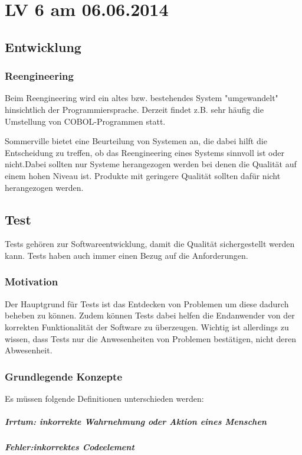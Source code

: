 \chapter{LV 6 am 06.06.2014}
\section{Entwicklung}
\subsection{Reengineering}
Beim Reengineering wird ein altes bzw. bestehendes System "umgewandelt" hinsichtlich der Programmiersprache. Derzeit findet z.B. sehr häufig die Umstellung von COBOL-Programmen statt.

Sommerville bietet eine Beurteilung von Systemen an, die dabei hilft die Entscheidung zu treffen, ob das Reengineering eines Systems sinnvoll ist oder nicht.Dabei sollten nur Systeme herangezogen werden bei denen die Qualität auf einem hohen Niveau ist. Produkte mit geringere Qualität sollten dafür nicht herangezogen werden.

\section{Test}
Tests gehören zur Softwareentwicklung, damit die Qualität sichergestellt werden kann. Tests haben auch immer einen Bezug auf die Anforderungen. 
\subsection{Motivation}
Der Hauptgrund für Tests ist das Entdecken von Problemen um diese dadurch beheben zu können. Zudem  können Tests dabei helfen die Endanwender von der korrekten Funktionalität der Software zu überzeugen. Wichtig ist allerdings zu wissen, dass Tests nur die Anwesenheiten von Problemen bestätigen, nicht deren Abwesenheit.

\subsection{Grundlegende Konzepte}
Es müssen folgende Definitionen unterschieden werden:
\paragraph{Irrtum: inkorrekte Wahrnehmung oder Aktion eines Menschen}
\paragraph{Fehler:inkorrektes Codeelement}
